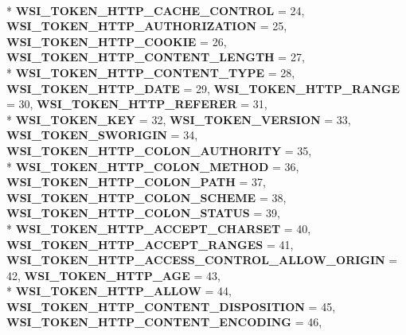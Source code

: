 \begin{DoxyCompactItemize}
\\*
{\bfseries W\+S\+I\+\_\+\+T\+O\+K\+E\+N\+\_\+\+H\+T\+T\+P\+\_\+\+C\+A\+C\+H\+E\+\_\+\+C\+O\+N\+T\+R\+OL} = 24, 
{\bfseries W\+S\+I\+\_\+\+T\+O\+K\+E\+N\+\_\+\+H\+T\+T\+P\+\_\+\+A\+U\+T\+H\+O\+R\+I\+Z\+A\+T\+I\+ON} = 25, 
{\bfseries W\+S\+I\+\_\+\+T\+O\+K\+E\+N\+\_\+\+H\+T\+T\+P\+\_\+\+C\+O\+O\+K\+IE} = 26, 
{\bfseries W\+S\+I\+\_\+\+T\+O\+K\+E\+N\+\_\+\+H\+T\+T\+P\+\_\+\+C\+O\+N\+T\+E\+N\+T\+\_\+\+L\+E\+N\+G\+TH} = 27, 
\\*
{\bfseries W\+S\+I\+\_\+\+T\+O\+K\+E\+N\+\_\+\+H\+T\+T\+P\+\_\+\+C\+O\+N\+T\+E\+N\+T\+\_\+\+T\+Y\+PE} = 28, 
{\bfseries W\+S\+I\+\_\+\+T\+O\+K\+E\+N\+\_\+\+H\+T\+T\+P\+\_\+\+D\+A\+TE} = 29, 
{\bfseries W\+S\+I\+\_\+\+T\+O\+K\+E\+N\+\_\+\+H\+T\+T\+P\+\_\+\+R\+A\+N\+GE} = 30, 
{\bfseries W\+S\+I\+\_\+\+T\+O\+K\+E\+N\+\_\+\+H\+T\+T\+P\+\_\+\+R\+E\+F\+E\+R\+ER} = 31, 
\\*
{\bfseries W\+S\+I\+\_\+\+T\+O\+K\+E\+N\+\_\+\+K\+EY} = 32, 
{\bfseries W\+S\+I\+\_\+\+T\+O\+K\+E\+N\+\_\+\+V\+E\+R\+S\+I\+ON} = 33, 
{\bfseries W\+S\+I\+\_\+\+T\+O\+K\+E\+N\+\_\+\+S\+W\+O\+R\+I\+G\+IN} = 34, 
{\bfseries W\+S\+I\+\_\+\+T\+O\+K\+E\+N\+\_\+\+H\+T\+T\+P\+\_\+\+C\+O\+L\+O\+N\+\_\+\+A\+U\+T\+H\+O\+R\+I\+TY} = 35, 
\\*
{\bfseries W\+S\+I\+\_\+\+T\+O\+K\+E\+N\+\_\+\+H\+T\+T\+P\+\_\+\+C\+O\+L\+O\+N\+\_\+\+M\+E\+T\+H\+OD} = 36, 
{\bfseries W\+S\+I\+\_\+\+T\+O\+K\+E\+N\+\_\+\+H\+T\+T\+P\+\_\+\+C\+O\+L\+O\+N\+\_\+\+P\+A\+TH} = 37, 
{\bfseries W\+S\+I\+\_\+\+T\+O\+K\+E\+N\+\_\+\+H\+T\+T\+P\+\_\+\+C\+O\+L\+O\+N\+\_\+\+S\+C\+H\+E\+ME} = 38, 
{\bfseries W\+S\+I\+\_\+\+T\+O\+K\+E\+N\+\_\+\+H\+T\+T\+P\+\_\+\+C\+O\+L\+O\+N\+\_\+\+S\+T\+A\+T\+US} = 39, 
\\*
{\bfseries W\+S\+I\+\_\+\+T\+O\+K\+E\+N\+\_\+\+H\+T\+T\+P\+\_\+\+A\+C\+C\+E\+P\+T\+\_\+\+C\+H\+A\+R\+S\+ET} = 40, 
{\bfseries W\+S\+I\+\_\+\+T\+O\+K\+E\+N\+\_\+\+H\+T\+T\+P\+\_\+\+A\+C\+C\+E\+P\+T\+\_\+\+R\+A\+N\+G\+ES} = 41, 
{\bfseries W\+S\+I\+\_\+\+T\+O\+K\+E\+N\+\_\+\+H\+T\+T\+P\+\_\+\+A\+C\+C\+E\+S\+S\+\_\+\+C\+O\+N\+T\+R\+O\+L\+\_\+\+A\+L\+L\+O\+W\+\_\+\+O\+R\+I\+G\+IN} = 42, 
{\bfseries W\+S\+I\+\_\+\+T\+O\+K\+E\+N\+\_\+\+H\+T\+T\+P\+\_\+\+A\+GE} = 43, 
\\*
{\bfseries W\+S\+I\+\_\+\+T\+O\+K\+E\+N\+\_\+\+H\+T\+T\+P\+\_\+\+A\+L\+L\+OW} = 44, 
{\bfseries W\+S\+I\+\_\+\+T\+O\+K\+E\+N\+\_\+\+H\+T\+T\+P\+\_\+\+C\+O\+N\+T\+E\+N\+T\+\_\+\+D\+I\+S\+P\+O\+S\+I\+T\+I\+ON} = 45, 
{\bfseries W\+S\+I\+\_\+\+T\+O\+K\+E\+N\+\_\+\+H\+T\+T\+P\+\_\+\+C\+O\+N\+T\+E\+N\+T\+\_\+\+E\+N\+C\+O\+D\+I\+NG} = 46, 

\end{DoxyCompactItemize}

